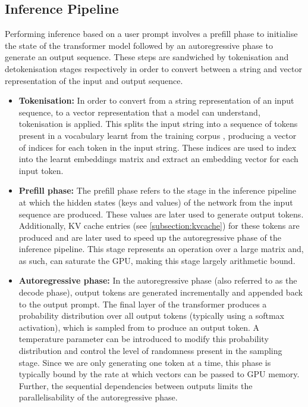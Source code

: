 \documentclass[11pt,twoside]{report}
\begin{document}
\subsection{Inference Pipeline}\label{subsection:inferencepipeline}
Performing inference based on a user prompt involves a prefill phase to initialise the state of the transformer model followed by an autoregressive phase to generate an output sequence.
These steps are sandwiched by tokenisation and detokenisation stages respectively in order to convert between a string and vector representation of the input and output sequence.
\begin{itemize}
  \item \textbf{Tokenisation:}
    In order to convert from a string representation of an input sequence, to a vector representation that a model can understand, tokenisation is applied.
    This splits the input string into a sequence of tokens present in a vocabulary learnt from the training corpus \cite{radford2019language} \cite{sennrich2015neural}, producing a vector of indices for each token in the input string.
    These indices are used to index into the learnt embeddings matrix and extract an embedding vector for each input token.
  \item \textbf{Prefill phase:}
    The prefill phase refers to the stage in the inference pipeline at which the hidden states (keys and values) of the network from the input sequence are produced.
    These values are later used to generate output tokens.
    Additionally, KV cache entries (see \ref{subsection:kvcache}) for these tokens are produced and are later used to speed up the autoregressive phase of the inference pipeline.
    This stage represents an operation over a large matrix and, as such, can saturate the GPU, making this stage largely arithmetic bound.
  \item \textbf{Autoregressive phase:}
    In the autoregressive phase (also referred to as the decode phase), output tokens are generated incrementally and appended back to the output prompt. 
    The final layer of the transformer produces a probability distribution over all output tokens (typically using a softmax activation), which is sampled from to produce an output token.
    A temperature parameter can be introduced to modify this probability distribution and control the level of randomness present in the sampling stage.
    Since we are only generating one token at a time, this phase is typically bound by the rate at which vectors can be passed to GPU memory.
    Further, the sequential dependencies between outputs limits the parallelisability of the autoregressive phase.

\end{itemize}
\end{document}
